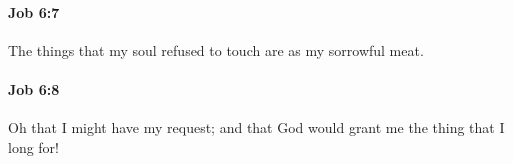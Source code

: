 		\paragraph{Job 6:7} %
			\label{JOB-6-7}

			The things that my soul refused to touch are as my sorrowful meat.


		\paragraph{Job 6:8} %
			\label{JOB-6-8}

			Oh that I might have my request; and that God would grant me the thing that I long for!


